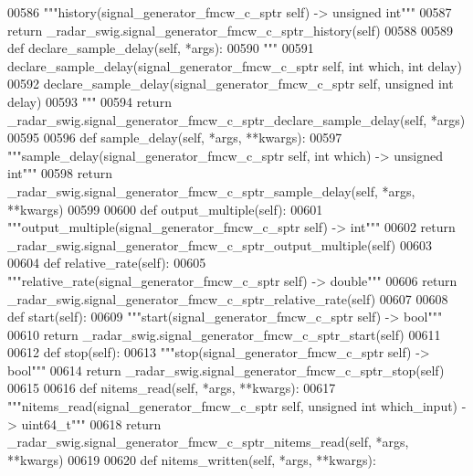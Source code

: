 \begin{DoxyCode}
{{{{00586         \textcolor{stringliteral}{"""history(signal\_generator\_fmcw\_c\_sptr self) -> unsigned int"""}
00587         \textcolor{keywordflow}{return} \_radar\_swig.signal\_generator\_fmcw\_c\_sptr\_history(self)
00588 
00589     \textcolor{keyword}{def }declare_sample_delay(self, *args):
00590         \textcolor{stringliteral}{"""}
00591 \textcolor{stringliteral}{        declare\_sample\_delay(signal\_generator\_fmcw\_c\_sptr self, int which, int delay)}
00592 \textcolor{stringliteral}{        declare\_sample\_delay(signal\_generator\_fmcw\_c\_sptr self, unsigned int delay)}
00593 \textcolor{stringliteral}{        """}
00594         \textcolor{keywordflow}{return} \_radar\_swig.signal\_generator\_fmcw\_c\_sptr\_declare\_sample\_delay(self, *args)
00595 
00596     \textcolor{keyword}{def }sample_delay(self, *args, **kwargs):
00597         \textcolor{stringliteral}{"""sample\_delay(signal\_generator\_fmcw\_c\_sptr self, int which) -> unsigned int"""}
00598         \textcolor{keywordflow}{return} \_radar\_swig.signal\_generator\_fmcw\_c\_sptr\_sample\_delay(self, *args, **kwargs)
00599 
00600     \textcolor{keyword}{def }output_multiple(self):
00601         \textcolor{stringliteral}{"""output\_multiple(signal\_generator\_fmcw\_c\_sptr self) -> int"""}
00602         \textcolor{keywordflow}{return} \_radar\_swig.signal\_generator\_fmcw\_c\_sptr\_output\_multiple(self)
00603 
00604     \textcolor{keyword}{def }relative_rate(self):
00605         \textcolor{stringliteral}{"""relative\_rate(signal\_generator\_fmcw\_c\_sptr self) -> double"""}
00606         \textcolor{keywordflow}{return} \_radar\_swig.signal\_generator\_fmcw\_c\_sptr\_relative\_rate(self)
00607 
00608     \textcolor{keyword}{def }start(self):
00609         \textcolor{stringliteral}{"""start(signal\_generator\_fmcw\_c\_sptr self) -> bool"""}
00610         \textcolor{keywordflow}{return} \_radar\_swig.signal\_generator\_fmcw\_c\_sptr\_start(self)
00611 
00612     \textcolor{keyword}{def }stop(self):
00613         \textcolor{stringliteral}{"""stop(signal\_generator\_fmcw\_c\_sptr self) -> bool"""}
00614         \textcolor{keywordflow}{return} \_radar\_swig.signal\_generator\_fmcw\_c\_sptr\_stop(self)
00615 
00616     \textcolor{keyword}{def }nitems_read(self, *args, **kwargs):
00617         \textcolor{stringliteral}{"""nitems\_read(signal\_generator\_fmcw\_c\_sptr self, unsigned int which\_input) -> uint64\_t"""}
00618         \textcolor{keywordflow}{return} \_radar\_swig.signal\_generator\_fmcw\_c\_sptr\_nitems\_read(self, *args, **kwargs)
00619 
00620     \textcolor{keyword}{def }nitems_written(self, *args, **kwargs):
}}}}
\end{DoxyCode}
